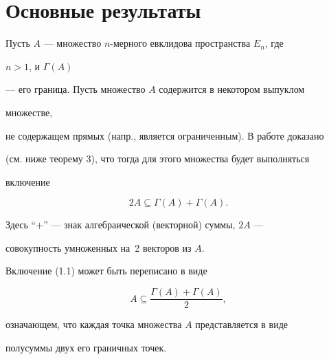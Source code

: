  


\date{} 




\pagestyle{plain} %


 




\maketitle 


\label{begin} 


 


\section{Основные результаты} 


 


Пусть $A$ --- множество $n$-мерного евклидова пространства $E_n$, где 


$n>1$, и $\Gamma(A)$ 


--- его граница. Пусть множество $A$ содержится в некотором выпуклом 


множестве, 


не содержащем прямых (напр., является ограниченным). В работе доказано 


(см. ниже теорему 3), что тогда для этого множества будет выполняться 


включение 


\begin{equation} 


2A\subseteq\Gamma(A)+\Gamma(A). 


\end{equation} 


Здесь ``$+$'' --- знак алгебраической (векторной) суммы, $2A$ --- 


совокупность умноженных на~2 векторов из $A$. 


Включение (1.1) может быть переписано в виде 


$$ 


A\subseteq\frac{\Gamma(A)+\Gamma(A)}{2},


$$ 


означающем, что каждая точка множества $A$ представляется в виде 


полусуммы двух его граничных точек. 



